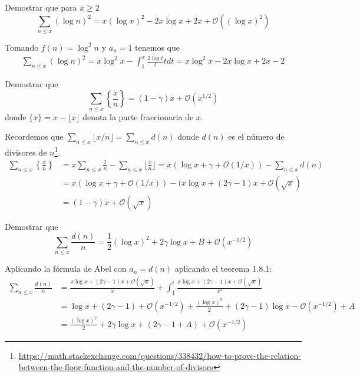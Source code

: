 \documentclass[twoside]{article}
\begin{document}
\newpage

\begin{ejercicio}{3}
Demostrar que para $x ≥ 2$
\[ \sum_{n≤x} (\log n)^2 = x(\log x)^2 - 2x \log x + 2x + \mathcal{O}((\log x)^2) \]
\end{ejercicio}
\begin{sol}
Tomando $f(n)=\log^2 n$ y $a_n=1$ tenemos que 
\begin{align*}
	\sum_{n≤x} (\log n)^2 = x\log^2 x - \int_1^x \frac{2\log t}{t}tdt = x\log^2 x - 2x\log x +2x -2
\end{align*}
\end{sol}

\newpage

\begin{ejercicio}{4}
Demostrar que
\[ \sum_{n≤x} \left\{ \frac{x}{n} \right\} = (1-γ)x + \mathcal{O}(x^{1/2}) \]
donde $\{x\}=x-\lfloor x \rfloor$ denota la parte fraccionaria de $x$.
\end{ejercicio}
\begin{sol}
Recordemos que $\sum_{n≤x} \lfloor x/n \rfloor = \sum_{n≤x} d(n)$ donde $d(n)$ es el número de divisores de $n$\footnote{\url{https://math.stackexchange.com/questions/338432/how-to-prove-the-relation-between-the-floor-function-and-the-number-of-divisors}}.
\begin{align*}
	\sum_{n≤x} \left\{ \frac{x}{n} \right\} & = x\sum_{n≤x} \frac{1}{n} - \sum_{n≤x} \lfloor \frac{x}{n}\rfloor = x(\log x + γ + \mathcal{O}(1/x))- \sum_{n≤x} d(n)\\
	& = x(\log x + γ + \mathcal{O}(1/x))- (x \log x + (2γ-1)x + \mathcal{O}(\sqrt{x})\\
	& = (1-γ)x + \mathcal{O}(\sqrt{x})
\end{align*}
\end{sol}

\newpage

\begin{ejercicio}{5}
Demostrar que
\[ \sum_{n≤x} \frac{d(n)}{n} = \frac{1}{2} (\log x)^2 + 2γ\log x + B + \mathcal{O}(x^{-1/2}) \]
\end{ejercicio}
\begin{sol}
Aplicando la fórmula de Abel con $a_n=d(n)$ aplicando el teorema 1.8.1:
\begin{align*}
	\sum_{n≤x} \frac{d(n)}{n} & = \frac{x \log x + (2γ-1)x + \mathcal{O}(\sqrt{x})}{x} + \int_1^t \frac{x \log x + (2γ-1)x + \mathcal{O}(\sqrt{x})}{x^2}\\
	& = \log x + (2γ-1) + \mathcal{O}(x^{-1/2}) + \frac{(\log x)^2}{2} + (2γ-1)\log x - \mathcal{O}(x^{-1/2}) + A\\
	& = \frac{(\log x)^2}{2} + 2γ\log x + (2γ-1 + A) + \mathcal{O}(x^{-1/2})
\end{align*}
\end{sol}
\end{document}
